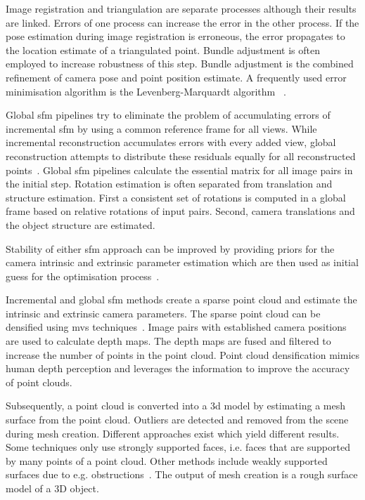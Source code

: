 Image registration and triangulation are separate processes although their results are linked. Errors of one process can increase the error in the other process. If the pose estimation during image registration is erroneous, the error propagates to the location estimate of a triangulated point. Bundle adjustment is often employed to increase robustness of this step. Bundle adjustment is the combined refinement of camera pose and point position estimate. A frequently used error minimisation algorithm is the Levenberg-Marquardt algorithm ~\cite{schonberger2016structure, Moulon2013AdaptiveEstimation}.

Global \gls{sfm} pipelines try to eliminate the problem of accumulating errors of incremental \gls{sfm} by using a common reference frame for all views. While incremental reconstruction accumulates errors with every added view, global reconstruction attempts to distribute these residuals equally for all reconstructed points~\cite{Moulon2013GlobalMotion}. Global \gls{sfm} pipelines calculate the essential matrix for all image pairs in the initial step. Rotation estimation is often separated from translation and structure estimation. First a consistent set of rotations is computed in a global frame based on relative rotations of input pairs. Second, camera translations and the object structure are estimated.

Stability of either \gls{sfm} approach can be improved by providing priors for the camera intrinsic and extrinsic parameter estimation which are then used as initial guess for the optimisation process~\cite{Irschara2011EfficientPriors}.

Incremental and global \gls{sfm} methods create a sparse point cloud and estimate the intrinsic and extrinsic camera parameters. The sparse point cloud can be densified using \gls{mvs} techniques~\cite{Pagani2011DenseImages}. Image pairs with established camera positions are used to calculate depth maps. The depth maps are fused and filtered to increase the number of points in the point cloud. Point cloud densification mimics human depth perception and leverages the information to improve the accuracy of point clouds.

Subsequently, a point cloud is converted into a \gls{3d} model by estimating a mesh surface from the point cloud. Outliers are detected and removed from the scene during mesh creation. Different approaches exist which yield different results. Some techniques only use strongly supported faces, i.e. faces that are supported by many points of a point cloud. Other methods include weakly supported surfaces due to e.g. obstructions~\cite{Jancosek2014ExploitingSurfaces}. The output of mesh creation is a rough surface model of a 3D object.

